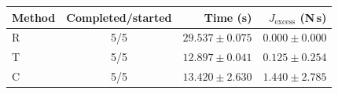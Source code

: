 \begin{tabular}{lcrr}
\toprule
Method & Completed/started & Time (s) & $J_{\mathrm{excess}}$ (N\,s) \\
\midrule
R & 5/5 & $29.537 \pm 0.075$ & $0.000 \pm 0.000$ \\
T & 5/5 & $12.897 \pm 0.041$ & $0.125 \pm 0.254$ \\
C & 5/5 & $13.420 \pm 2.630$ & $1.440 \pm 2.785$ \\
\bottomrule
\end{tabular}
